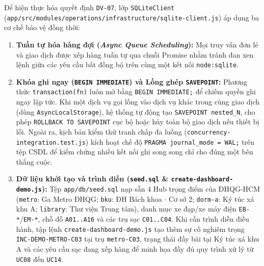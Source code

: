 Để hiện thực hóa quyết định \texttt{DV-07}, lớp \texttt{SQLiteClient} (\texttt{app/src/modules/\allowbreak operations/\allowbreak infrastructure/\allowbreak sqlite-client.js}) áp dụng ba cơ chế bảo vệ đồng thời:
\begin{enumerate}[leftmargin=*,nosep]
    \item \textbf{Tuần tự hóa hàng đợi (\textit{Async Queue Scheduling}):} Mọi truy vấn đơn lẻ và giao dịch được xếp hàng tuần tự qua chuỗi Promise nhằm tránh đan xen lệnh giữa các yêu cầu bất đồng bộ trên cùng một kết nối \texttt{node:sqlite}.
    \item \textbf{Khóa ghi ngay (\texttt{BEGIN IMMEDIATE}) và Lồng ghép \texttt{SAVEPOINT}:} Phương thức \texttt{transaction(fn)} luôn mở bằng \texttt{BEGIN IMMEDIATE;} để chiếm quyền ghi ngay lập tức. Khi một dịch vụ gọi lồng vào dịch vụ khác trong cùng giao dịch (dùng \texttt{AsyncLocalStorage}), hệ thống tự động tạo \texttt{SAVEPOINT nested\_N}, cho phép \texttt{ROLLBACK TO SAVEPOINT} cục bộ hoặc hủy toàn bộ giao dịch nếu thiết bị lỗi. Ngoài ra, kịch bản kiểm thử tranh chấp đa luồng (\texttt{concurrency-integration.test.js}) kích hoạt chế độ \texttt{PRAGMA journal\_mode = WAL;} trên tệp CSDL để kiểm chứng nhiều kết nối ghi song song chỉ cho đúng một bên thắng cuộc.
    \item \textbf{Dữ liệu khởi tạo và trình diễn (\texttt{seed.sql} \& \texttt{create-dashboard-demo.js}):} Tệp \texttt{app/db/seed.sql} nạp sẵn 4 Hub trọng điểm của ĐHQG-HCM (\texttt{metro}: Ga Metro ĐHQG; \texttt{bku}: ĐH Bách khoa $\cdot$ Cơ sở 2; \texttt{dorm-a}: Ký túc xá khu A; \texttt{library}: Thư viện Trung tâm), danh mục xe đạp/xe máy điện \texttt{EB-*}/\texttt{EM-*}, chỗ đỗ \texttt{A01..A16} và các trụ sạc \texttt{C01..C04}. Khi cần trình diễn điều hành, tập lệnh \texttt{create-dashboard-demo.js} tạo thêm sự cố nghiêm trọng \texttt{INC-DEMO-METRO-C03} tại trụ \texttt{metro-C03}, trạng thái đầy bãi tại Ký túc xá khu A và các yêu cầu sạc đang xếp hàng để minh họa đầy đủ quy trình xử lý từ \texttt{UC08} đến \texttt{UC14}.
\end{enumerate}
